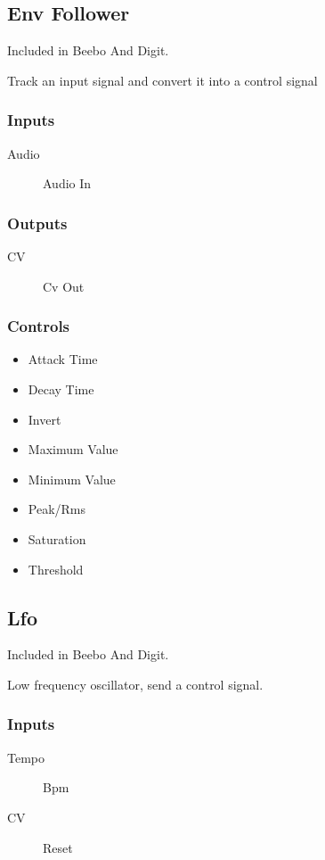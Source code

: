 \subsection{Env Follower}

Included in Beebo And Digit.

Track an input signal and convert it into a control signal



\subsubsection{Inputs}
\begin{description}
\item [Audio] Audio In
\end{description}

\subsubsection{Outputs}
\begin{description}
\item [CV] Cv Out
\end{description}

\subsubsection{Controls}
\begin{itemize}
\item Attack Time
\item Decay Time
\item Invert
\item Maximum Value
\item Minimum Value
\item Peak/Rms
\item Saturation
\item Threshold
\end{itemize}

\subsection{Lfo}

Included in Beebo And Digit.

Low frequency oscillator, send a control signal.



\subsubsection{Inputs}
\begin{description}
\item [Tempo] Bpm
\item [CV] Reset
\end{description}

